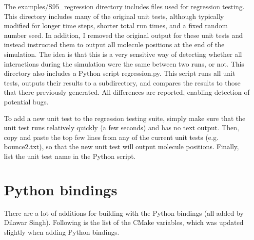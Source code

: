 \documentclass {book}
\begin{document}
The examples/S95\_regression directory includes files used for regression testing.  This directory includes many of the original unit tests, although typically modified for longer time steps, shorter total run times, and a fixed random number seed.  In addition, I removed the original output for these unit tests and instead instructed them to output all molecule positions at the end of the simulation.  The idea is that this is a very sensitive way of detecting whether all interactions during the simulation were the same between two runs, or not.  This directory also includes a Python script regression.py.  This script runs all unit tests, outputs their results to a subdirectory, and compares the results to those that there previously generated.  All differences are reported, enabling detection of potential bugs.

To add a new unit test to the regression testing suite, simply make sure that the unit test runs relatively quickly (a few seconds) and has no text output.  Then, copy and paste the top few lines from any of the current unit tests (e.g. bounce2.txt), so that the new unit test will output molecule positions.  Finally, list the unit test name in the Python script.

\section{Python bindings}

There are a lot of additions for building with the Python bindings (all added by Dilawar Singh). Following is the list of the CMake variables, which was updated slightly when adding Python bindings.
\end{document}
